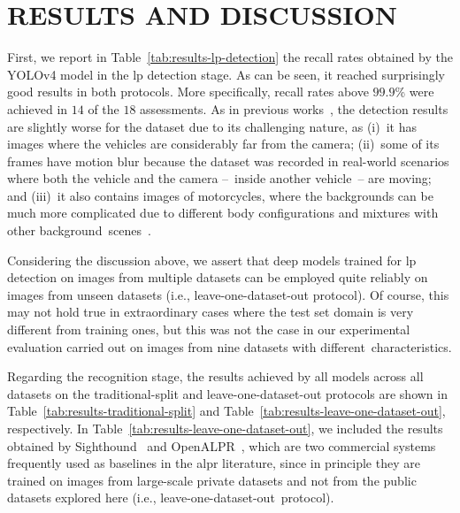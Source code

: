 



\section{\uppercase{Results and Discussion}}
\label{sec:results}

First, we report in Table~\ref{tab:results-lp-detection} the recall rates obtained by the YOLOv4 model in the \gls*{lp} detection stage.
As can be seen, it reached surprisingly good results in both protocols.
More specifically, recall rates above $99.9$\% were achieved in $14$ of the $18$ assessments. 
As in previous works~\citep{laroca2018robust,goncalves2018realtime,silva2020realtime}, the detection results are slightly worse for the \ufpralpr dataset due to its challenging nature, as (i)~it has images where the vehicles are considerably far from the camera;
(ii)~some of its frames have motion blur because the dataset was recorded in real-world scenarios where both the vehicle and the camera --~inside another vehicle~-- are moving;
and (iii)~it also contains images of motorcycles, where the backgrounds can be much more complicated due to different body configurations and mixtures with other background~scenes~\citep{hsu2015comparison}.

Considering the discussion above, we assert that deep models trained for \gls*{lp} detection on images from multiple datasets can be employed quite reliably on images from unseen datasets (i.e., leave-one-dataset-out protocol).
Of course, this may not hold true in extraordinary cases where the test set domain is very different from training ones, but this was not the case in our experimental evaluation carried out on images from nine datasets with different~characteristics.

Regarding the recognition stage, the results achieved by all models across all datasets on the traditional-split and leave-one-dataset-out protocols are shown in Table~\ref{tab:results-traditional-split} and Table~\ref{tab:results-leave-one-dataset-out}, respectively.
In Table~\ref{tab:results-leave-one-dataset-out}, we included the results obtained by Sighthound~\citep{masood2017sighthound} and OpenALPR~\citep{openalprapi}, which are two commercial systems frequently used as baselines in the \gls*{alpr} literature, since in principle they are trained on images from large-scale private datasets and not from the public datasets explored here (i.e., leave-one-dataset-out~protocol).

